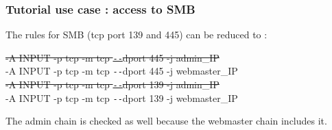 \documentclass[14pt]{beamer}
\newcommand{\dd}{{\texttt{-{}-}}}
\begin{document}
  \begin{frame}
    \frametitle{Tutorial use case : access to SMB}
    The rules for SMB (tcp port 139 and 445) can be reduced to :
    \begin{example}
      \small{\sout{{\color{red}-A INPUT -p tcp -m tcp \dd dport 445 -j admin\_IP}}\\
      -A INPUT -p tcp -m tcp \dd dport 445 -j webmaster\_IP\\
      \sout{{\color{red}-A INPUT -p tcp -m tcp \dd dport 139 -j admin\_IP}}\\
      -A INPUT -p tcp -m tcp \dd dport 139 -j webmaster\_IP}
    \end{example}
  The admin chain is checked as well because the webmaster chain includes it.
  \end{frame}
\end{document}
